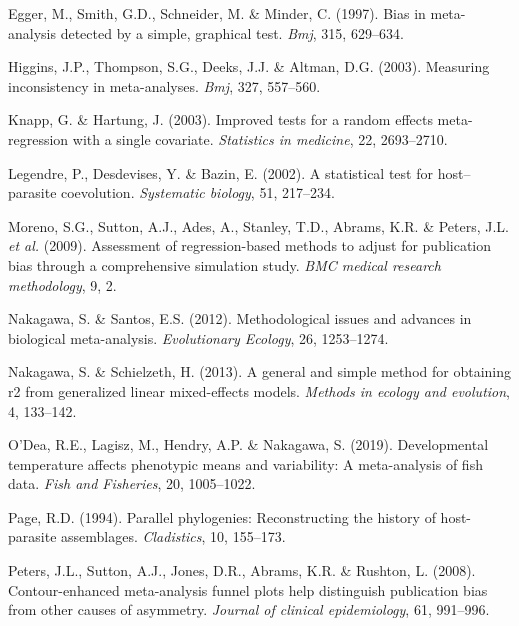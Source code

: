 \documentclass[
]{article}
\begin{document}
\leavevmode\hypertarget{ref-egger1997bias}{}%
Egger, M., Smith, G.D., Schneider, M. \& Minder, C. (1997). Bias in
meta-analysis detected by a simple, graphical test. \emph{Bmj}, 315,
629--634.

\leavevmode\hypertarget{ref-higgins2003measuring}{}%
Higgins, J.P., Thompson, S.G., Deeks, J.J. \& Altman, D.G. (2003).
Measuring inconsistency in meta-analyses. \emph{Bmj}, 327, 557--560.

\leavevmode\hypertarget{ref-knapp2003improved}{}%
Knapp, G. \& Hartung, J. (2003). Improved tests for a random effects
meta-regression with a single covariate. \emph{Statistics in medicine},
22, 2693--2710.

\leavevmode\hypertarget{ref-legendre2002statistical}{}%
Legendre, P., Desdevises, Y. \& Bazin, E. (2002). A statistical test for
host--parasite coevolution. \emph{Systematic biology}, 51, 217--234.

\leavevmode\hypertarget{ref-moreno2009assessment}{}%
Moreno, S.G., Sutton, A.J., Ades, A., Stanley, T.D., Abrams, K.R. \&
Peters, J.L. \emph{et al.} (2009). Assessment of regression-based
methods to adjust for publication bias through a comprehensive
simulation study. \emph{BMC medical research methodology}, 9, 2.

\leavevmode\hypertarget{ref-nakagawa2012methodological}{}%
Nakagawa, S. \& Santos, E.S. (2012). Methodological issues and advances
in biological meta-analysis. \emph{Evolutionary Ecology}, 26,
1253--1274.

\leavevmode\hypertarget{ref-nakagawa2013general}{}%
Nakagawa, S. \& Schielzeth, H. (2013). A general and simple method for
obtaining r2 from generalized linear mixed-effects models. \emph{Methods
in ecology and evolution}, 4, 133--142.

\leavevmode\hypertarget{ref-odea2018developmental}{}%
O'Dea, R.E., Lagisz, M., Hendry, A.P. \& Nakagawa, S. (2019).
Developmental temperature affects phenotypic means and variability: A
meta-analysis of fish data. \emph{Fish and Fisheries}, 20, 1005--1022.

\leavevmode\hypertarget{ref-page1994parallel}{}%
Page, R.D. (1994). Parallel phylogenies: Reconstructing the history of
host-parasite assemblages. \emph{Cladistics}, 10, 155--173.

\leavevmode\hypertarget{ref-peters2008contour}{}%
Peters, J.L., Sutton, A.J., Jones, D.R., Abrams, K.R. \& Rushton, L.
(2008). Contour-enhanced meta-analysis funnel plots help distinguish
publication bias from other causes of asymmetry. \emph{Journal of
clinical epidemiology}, 61, 991--996.
\end{document}
